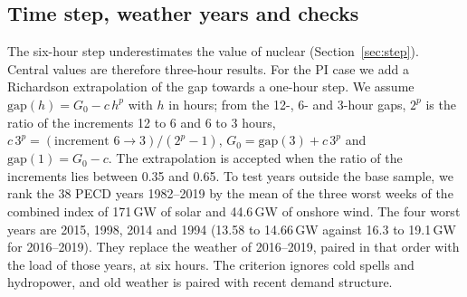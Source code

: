 \subsection{Time step, weather years and checks}\label{sec:stepmethods}
The six-hour step underestimates the value of nuclear (Section~\ref{sec:step}). Central values are therefore three-hour results. For the PI case we add a Richardson extrapolation of the gap towards a one-hour step. We assume $\mathrm{gap}(h)=G_0-c\,h^p$ with $h$ in hours; from the 12-, 6- and 3-hour gaps, $2^p$ is the ratio of the increments 12 to 6 and 6 to 3 hours, $c\,3^p=(\text{increment }6\to3)/(2^p-1)$, $G_0=\mathrm{gap}(3)+c\,3^p$ and $\mathrm{gap}(1)=G_0-c$. The extrapolation is accepted when the ratio of the increments lies between 0.35 and 0.65.
To test years outside the base sample, we rank the 38 PECD years 1982--2019 by the mean of the three worst weeks of the combined index of 171\,GW of solar and 44.6\,GW of onshore wind. The four worst years are 2015, 1998, 2014 and 1994 (13.58 to 14.66\,GW against 16.3 to 19.1\,GW for 2016--2019). They replace the weather of 2016--2019, paired in that order with the load of those years, at six hours. The criterion ignores cold spells and hydropower, and old weather is paired with recent demand structure.
\FloatBarrier
